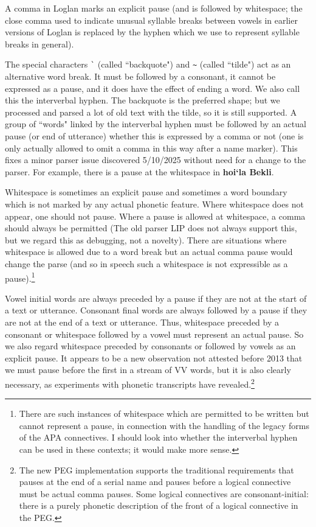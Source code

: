 \documentclass[12pt]{book}
\begin{document}
A comma in Loglan marks an explicit pause (and is followed by whitespace;  the close comma used to indicate unusual syllable breaks between vowels in earlier versions of Loglan is replaced by the hyphen which we use to represent syllable breaks in general).

The special characters \verb|`| (called ``backquote") and \verb|~| (called ``tilde") act as an alternative word break.  It must be followed by a consonant, it cannot be expressed as a pause, and it does have the effect of ending a word.  We also call this the interverbal hyphen.  The backquote is the preferred shape;  but we processed and parsed a lot of old text with the tilde, so it is still supported.  A group of ``words" linked by the interverbal hyphen must be followed by an actual pause (or end of utterance) whether this is expressed by a comma or not (one is only actually allowed to omit a comma in this way after a name marker).  This fixes a minor parser issue discovered 5/10/2025 without need for a change to the parser.  For example, there is a pause at the whitespace in {\bf hoi`la Bekli}.

Whitespace is sometimes an explicit pause and sometimes a word boundary which is not marked by any actual phonetic feature.  Where whitespace does not appear, one should not pause.  Where a pause is allowed at whitespace, a comma should always be permitted (The old parser LIP does not always support this, but we regard this as debugging, not a novelty).   There are situations where whitespace is allowed due to a word break but an actual comma pause would change the parse (and so in speech such a whitespace is not expressible as a pause).\footnote{There are such instances of whitespace which are permitted to be written but cannot represent a pause, in connection with the handling of the legacy forms of the APA connectives.  I should look into whether the interverbal hyphen can be used in these contexts;  it would make more sense.}

Vowel initial words are always preceded by a pause if they are not at the start of a text or utterance.  Consonant final words are always followed by a pause if they are not at the end of a text or utterance.  Thus, whitespace preceded by a consonant or whitespace followed by a vowel must represent an actual pause.  So we also regard whitespace preceded by consonants or followed by vowels
as an explicit pause.  It appears to be a new observation not attested before 2013  that we must pause before the first in a stream of VV words, but it is also clearly necessary, as experiments with phonetic transcripts have revealed.\footnote{The new PEG implementation supports the traditional requirements
that pauses at the end of a serial name and pauses before a logical connective must be actual comma pauses.  Some logical connectives are consonant-initial:  there is a purely phonetic description of the front of a logical connective in the PEG.}
\end{document}
